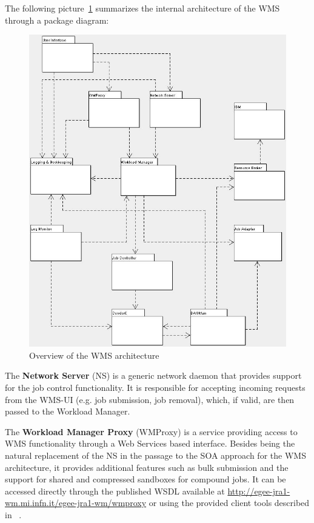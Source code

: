 The following picture~\ref{fig-arch} summarizes the internal architecture of the WMS through a package diagram:

\clearpage
\begin{figure}[htb]
\centering
\includegraphics[width=0.92\hsize]{glite-wms}
\caption{Overview of the WMS architecture}
\label{fig-arch}
\end{figure}


The {\bf Network Server} (NS) is a generic network daemon that provides support for the job control functionality. 
It is responsible for accepting incoming requests from the WMS-UI (e.g. job submission, job removal), which, if valid, 
are then passed to the Workload Manager.
\medskip

The {\bf Workload Manager Proxy} (WMProxy) is a service providing access to WMS functionality through a Web Services
based interface. Besides being the natural replacement of the NS in the passage to the SOA approach for the WMS 
architecture, it provides additional features such as bulk submission and the support for shared and compressed 
sandboxes for compound jobs. It can be accessed directly through the published WSDL available at 
\url{http://egee-jra1-wm.mi.infn.it/egee-jra1-wm/wmproxy} or using the provided client tools described in ~\cite{WMPROXY}. 

